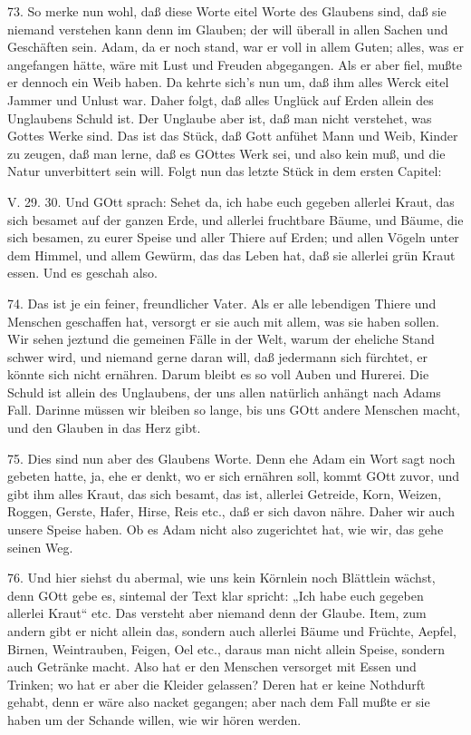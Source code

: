 73. So merke nun wohl, daß diese Worte eitel Worte des Glaubens sind, daß sie niemand verstehen kann denn im Glauben; der will überall in allen Sachen und Geschäften sein. Adam, da er noch stand, war er voll in allem Guten; alles, was er angefangen hätte, wäre mit Lust und Freuden abgegangen. Als er aber fiel, mußte er dennoch ein Weib haben. Da kehrte sich’s nun um, daß ihm alles Werck eitel Jammer und Unlust war. Daher folgt, daß alles Unglück auf Erden allein des Unglaubens Schuld ist. Der Unglaube aber ist, daß man nicht verstehet, was Gottes Werke sind. Das ist das Stück, daß Gott anfühet Mann und Weib, Kinder zu zeugen, daß man lerne, daß es GOttes Werk sei, und also kein muß, und die Natur unverbittert sein will. Folgt nun das letzte Stück in dem ersten Capitel:

\begin{schriftzitat}
V. 29. 30. Und GOtt sprach: Sehet da, ich habe euch gegeben allerlei Kraut, das sich besamet auf der ganzen Erde, und allerlei fruchtbare Bäume, und Bäume, die sich besamen, zu eurer Speise und aller Thiere auf Erden; und allen Vögeln unter dem Himmel, und allem Gewürm, das das Leben hat, daß sie allerlei grün Kraut essen. Und es geschah also.
\end{schriftzitat}

74. Das ist je ein feiner, freundlicher Vater. Als er alle lebendigen Thiere und Menschen geschaffen hat, versorgt er sie auch mit allem, was sie haben sollen. Wir sehen jeztund die gemeinen Fälle in der Welt, warum der eheliche Stand schwer wird, und niemand gerne daran will, daß jedermann sich fürchtet, er könnte sich nicht ernähren. Darum bleibt es so voll Auben und Hurerei. Die Schuld ist allein des Unglaubens, der uns allen natürlich anhängt nach Adams Fall. Darinne müssen wir bleiben so lange, bis uns GOtt andere Menschen macht, und den Glauben in das Herz gibt.

75. Dies sind nun aber des Glaubens Worte. Denn ehe Adam ein Wort sagt noch gebeten hatte, ja, ehe er denkt, wo er sich ernähren soll, kommt GOtt zuvor, und gibt ihm alles Kraut, das sich besamt, das ist, allerlei Getreide, Korn, Weizen, Roggen, Gerste, Hafer, Hirse, Reis etc., daß er sich davon nähre. Daher wir auch unsere Speise haben. Ob es Adam nicht also zugerichtet hat, wie wir, das gehe seinen Weg.

76. Und hier siehst du abermal, wie uns kein Körnlein noch Blättlein wächst, denn GOtt gebe es, sintemal der Text klar spricht: „Ich habe euch gegeben allerlei Kraut“ etc. Das versteht aber niemand denn der Glaube. Item, zum andern gibt er nicht allein das, sondern auch allerlei Bäume und Früchte, Aepfel, Birnen, Weintrauben, Feigen, Oel etc., daraus man nicht allein Speise, sondern auch Getränke macht. Also hat er den Menschen versorget mit Essen und Trinken; wo hat er aber die Kleider gelassen? Deren hat er keine Nothdurft gehabt, denn er wäre also nacket gegangen; aber nach dem Fall mußte er sie haben um der Schande willen, wie wir hören werden.

